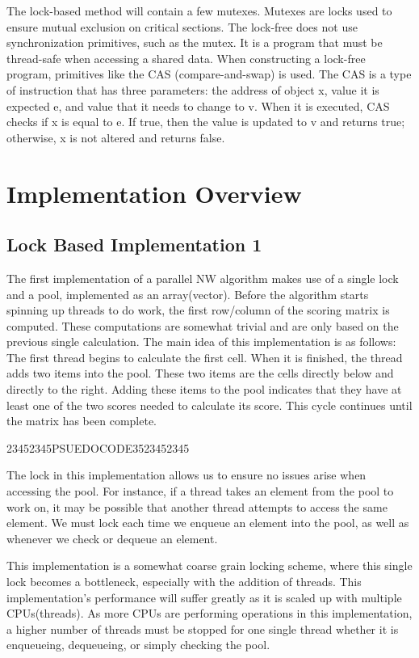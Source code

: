 \documentclass[letterpaper, 10 pt, conference]{IEEEconf}
\begin{document}
The lock-based method will contain a few mutexes. Mutexes are locks used to ensure mutual exclusion on critical sections. The lock-free does not use synchronization primitives, such as the mutex. It is a program that must be thread-safe when accessing a shared data. When constructing a lock-free program, primitives like the CAS (compare-and-swap) is used. The CAS is a type of instruction that has three parameters: the address of object x, value it is expected e, and value that it needs to change to v. When it is executed, CAS checks if x is equal to e. If true, then the value is updated to v and returns true; otherwise, x is not altered and returns false. 

\section{Implementation Overview}
\subsection{Lock Based Implementation 1}
The first implementation of a parallel NW algorithm makes use of a single lock and a pool, implemented as an array(vector). Before the algorithm starts spinning up threads to do work, the first row/column of the scoring matrix is computed. These computations are somewhat trivial and are only based on the previous single calculation. The main idea of this implementation is as follows: The first thread begins to calculate the first cell. When it is finished, the thread adds two items into the pool. These two items are the cells directly below and directly to the right. Adding these items to the pool indicates that they have at least one of the two scores needed to calculate its score. This cycle continues until the matrix has been complete.

23452345PSUEDOCODE3523452345


The lock in this implementation allows us to ensure no issues arise when accessing the pool. For instance, if a thread takes an element from the pool to work on, it may be possible that another thread attempts to access the same element. We must lock each time we enqueue an element into the pool, as well as whenever we check or dequeue an element. 

This implementation is a somewhat coarse grain locking scheme, where this single lock becomes a bottleneck, especially with the addition of threads. This implementation's performance will suffer greatly as it is scaled up with multiple CPUs(threads). As more CPUs are performing operations in this implementation, a higher number of threads must be stopped for one single thread whether it is enqueueing, dequeueing, or simply checking the pool. 
\end{document}
